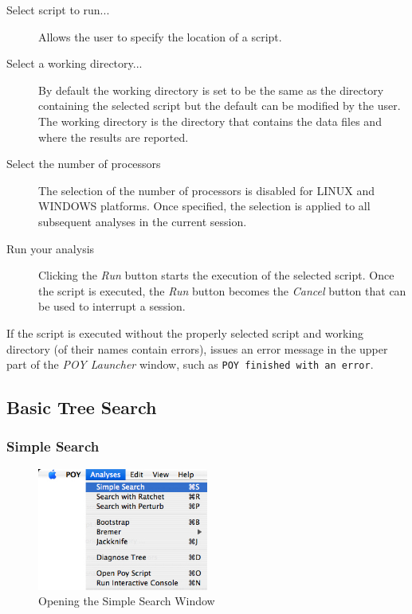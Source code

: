 \begin{description}

\item[Select script to run...]
     Allows the user to specify the location of a \poy script.

\item[Select a working directory...]
    By default the working directory is set to be the same as the
    directory containing the selected \poy script but the default
    can be modified by the user. The working directory is the
    directory that contains the data files and where the results
    are reported.

\item[Select the number of processors]
    The selection of the number of processors is disabled for LINUX
    and WINDOWS platforms. Once specified, the selection is applied
    to all subsequent analyses in the current \poy session.

\item[Run your analysis]
    Clicking the \emph{Run} button starts the execution of the selected
    script. Once the script is executed, the \emph{Run} button
    becomes the \emph{Cancel} button that can be used to interrupt
    a \poy session.
\end{description}

If the script is executed without the properly selected script and
working directory (of their names contain errors), \poy issues an
error message in the upper part of the \emph{POY Launcher} window,
such as \texttt{POY finished with an error}.

\subsection{Basic Tree Search}

\subsubsection{Simple Search}

\begin{figure}[htpb]
    \begin{center}
        \includegraphics[width=0.5\textwidth]{figures/SimpleSearch_Menu.jpg}
    \end{center}
    \caption{Opening the Simple Search Window}
    \label{fig:simple_search_menu}
\end{figure}

